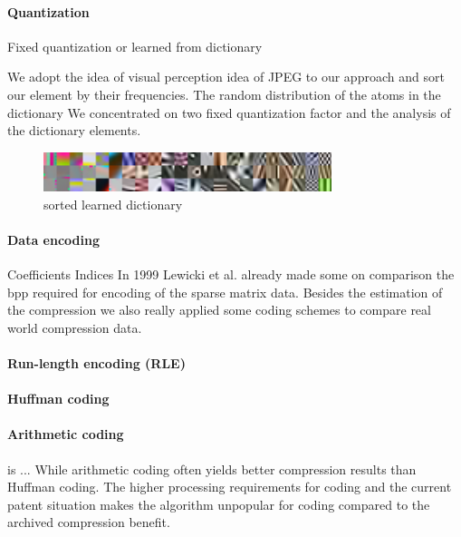 \paragraph{Quantization}

Fixed quantization or learned from dictionary

We adopt the idea of visual perception idea of JPEG to our
approach and sort our element by their frequencies.
The random distribution of the atoms in the dictionary 
We concentrated on two fixed quantization factor and the analysis of the
dictionary elements.


\begin{figure}[h]
\centering
\includegraphics[width = 0.75\textwidth]{images/sorted.png}
\caption{sorted learned dictionary}
\label{fig:sorted}
\end{figure}

\paragraph{Data encoding}

Coefficients
Indices
In 1999 Lewicki et al.\cite{Lewicki1999} already made some on comparison 
the bpp required for encoding of the sparse matrix data. Besides the estimation
of the compression we also really applied some coding schemes to compare real
world compression data.
\cite{Murray2006}

\paragraph{Run-length encoding (RLE)}
\paragraph{Huffman coding}
\paragraph{Arithmetic coding} is ...
While arithmetic coding often yields better compression results than Huffman
coding. The higher processing requirements for coding and the current patent
situation makes the algorithm unpopular for coding compared to the archived
compression benefit.

